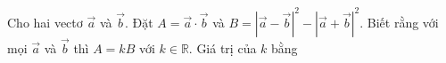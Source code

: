 \begin{ex}
Cho hai vectơ $\vec a$ và $\vec b$. Đặt $A=\vec a\cdot\vec b$ và $B=\left|\vec a-\vec b\right|^2-\left|\vec a+\vec b\right|^2$. Biết rằng với mọi $\vec a$ và $\vec b$ thì $A=kB$ với $k\in\mathbb R$. Giá trị của $k$ bằng
\end{ex}
